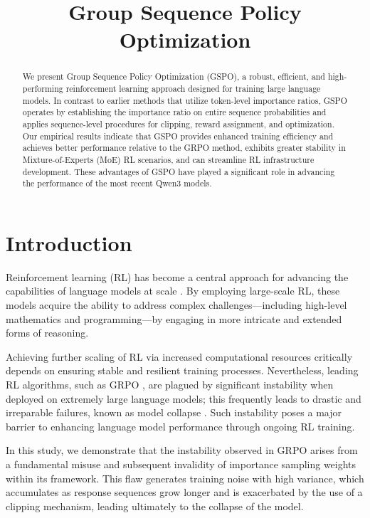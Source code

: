 \title{Group Sequence Policy Optimization}

\begin{abstract}
We present Group Sequence Policy Optimization (GSPO), a robust, efficient, and high-performing reinforcement learning approach designed for training large language models. In contrast to earlier methods that utilize token-level importance ratios, GSPO operates by establishing the importance ratio on entire sequence probabilities and applies sequence-level procedures for clipping, reward assignment, and optimization. Our empirical results indicate that GSPO provides enhanced training efficiency and achieves better performance relative to the GRPO method, exhibits greater stability in Mixture-of-Experts (MoE) RL scenarios, and can streamline RL infrastructure development. These advantages of GSPO have played a significant role in advancing the performance of the most recent Qwen3 models.
\end{abstract}

\section{Introduction}
\label{sec:intro}

Reinforcement learning (RL) has become a central approach for advancing the capabilities of language models at scale \citep{o1,dpsk-r1,qwq32b,qwen3}. By employing large-scale RL, these models acquire the ability to address complex challenges—including high-level mathematics and programming—by engaging in more intricate and extended forms of reasoning.

Achieving further scaling of RL via increased computational resources critically depends on ensuring stable and resilient training processes. Nevertheless, leading RL algorithms, such as GRPO \citep{grpo}, are plagued by significant instability when deployed on extremely large language models; this frequently leads to drastic and irreparable failures, known as model collapse \citep{qwen3, minimax-m1}. Such instability poses a major barrier to enhancing language model performance through ongoing RL training.

In this study, we demonstrate that the instability observed in GRPO arises from a fundamental misuse and subsequent invalidity of importance sampling weights within its framework. This flaw generates training noise with high variance, which accumulates as response sequences grow longer and is exacerbated by the use of a clipping mechanism, leading ultimately to the collapse of the model.

